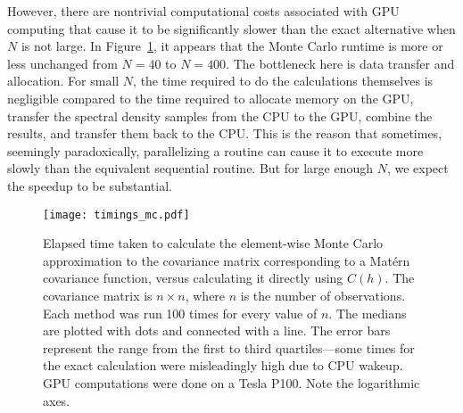 However, there are nontrivial computational costs associated with GPU computing that cause it to be significantly slower than the exact alternative when $N$ is not large. In Figure~\ref{fig:timings-mc}, it appears that the Monte Carlo runtime is more or less unchanged from $N = 40$ to $N = 400$. The bottleneck here is data transfer and allocation. For small $N$, the time required to do the calculations themselves is negligible compared to the time required to allocate memory on the GPU, transfer the spectral density samples from the CPU to the GPU, combine the results, and transfer them back to the CPU. This is the reason that sometimes, seemingly paradoxically, parallelizing a routine can cause it to execute more slowly than the equivalent sequential routine. But for large enough $N$, we expect the speedup to be substantial.

\begin{figure}[htbp]
	\centering
	\texttt{[image: timings\_mc.pdf]}
	\caption{Elapsed time taken to calculate the element-wise Monte Carlo approximation to the covariance matrix corresponding to a Mat\'ern covariance function, versus calculating it directly using $C(h)$. The covariance matrix is $n \times n$, where $n$ is the number of observations. Each method was run 100 times for every value of $n$. The medians are plotted with dots and connected with a line. The error bars represent the range from the first to third quartiles---some times for the exact calculation were misleadingly high due to CPU wakeup. GPU computations were done on a Tesla P100. Note the logarithmic axes.}
	\label{fig:timings-mc}
\end{figure}

